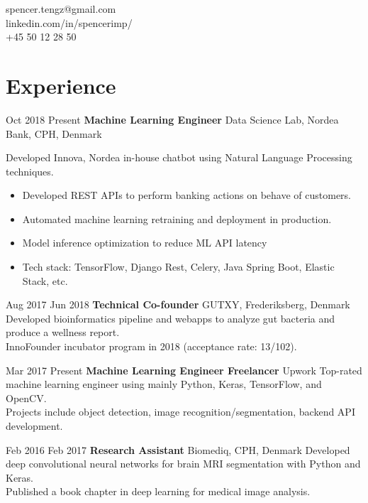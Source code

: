 \documentclass[11pt]{article} %
\begin{document}
{\begin{minipage}[t]{0.22\textwidth}
\begin{tabbing}
spencer.tengz@gmail.com \\ %
linkedin.com/in/spencerimp/ \\ %
+45 50 12 28 50 \\ %
\end{tabbing}
\end{minipage}


\section{Experience}
\job
{Oct 2018 }{Present}
{\textbf{Machine Learning Engineer}}
{}
{Data Science Lab, Nordea Bank, CPH, Denmark}
{
 
    Developed Innova, Nordea in-house chatbot using Natural Language Processing techniques.
    \begin{itemize}[itemsep=0pt]
    	\item  Developed REST APIs to perform banking actions on behave of customers.
    	\item  Automated machine learning retraining and deployment in production.
    	\item  Model inference optimization to reduce ML API latency
    	\item Tech stack: TensorFlow, Django Rest, Celery, Java Spring Boot, Elastic Stack, etc.
    \end{itemize}
}

\job
{Aug 2017 }{Jun 2018}
{\textbf{Technical Co-founder}}
{}
{GUTXY, Frederiksberg, Denmark}
{
	Developed bioinformatics pipeline and webapps to analyze gut bacteria and produce a wellness report.\\ 
	InnoFounder incubator program in 2018 (acceptance rate: 13/102).
}

\job
{Mar 2017 }{Present}
{\textbf{Machine Learning Engineer Freelancer}}
{}
{Upwork}
{
	Top-rated machine learning engineer using mainly Python, Keras, TensorFlow, and OpenCV.\\
	Projects include object detection, image recognition/segmentation, backend API development.
}


\job
{Feb 2016 }{Feb 2017}
{\textbf{Research Assistant}}
{}
{Biomediq, CPH, Denmark}
{
	Developed deep convolutional neural networks for brain MRI segmentation with Python and Keras.\\
	Published a book chapter in deep learning for medical image analysis.
}

}
\end{document}
